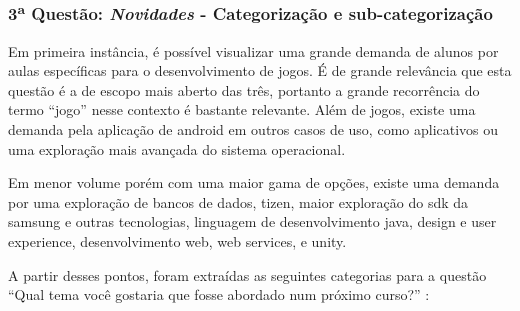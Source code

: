 

\subsubsection*{3\textsuperscript{a} Questão: \textit{Novidades} - Categorização e sub-categorização }

Em primeira instância, é possível visualizar uma grande demanda de alunos por aulas específicas para o desenvolvimento de jogos. É de grande relevância que esta questão é a de escopo mais aberto das três, portanto a grande recorrência do termo \enquote{jogo} nesse contexto é bastante relevante. Além de jogos, existe uma demanda pela aplicação de android em outros casos de uso, como aplicativos ou uma exploração mais avançada do sistema operacional. 

Em menor volume porém com uma maior gama de opções, existe uma demanda por uma exploração de bancos de dados, tizen, maior exploração do sdk da samsung e outras tecnologias, linguagem de desenvolvimento java, design e user experience, desenvolvimento web, web services, e unity. 

A partir desses pontos, foram extraídas as seguintes categorias para a questão \enquote{Qual tema você gostaria que fosse abordado num próximo curso?} :

